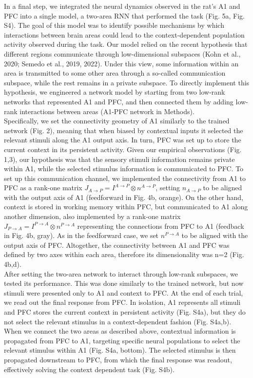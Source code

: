 \documentclass[12pt]{article}
\begin{document}
In a final step, we integrated the neural dynamics observed in the rat’s A1 and PFC into a single model, a two-area RNN that performed the task (Fig. 5a, Fig. S4). The goal of this model was to identify possible mechanisms by which interactions between brain areas could lead to the context-dependent population activity observed during the task. Our model relied on the recent hypothesis that different regions communicate through low-dimensional subspaces (Kohn et al., 2020; Semedo et al., 2019, 2022). Under this view, some information within an area is transmitted to some other area through a so-called communication subspace, while the rest remains in a private subspace. To directly implement this hypothesis, we engineered a network model by starting from two low-rank networks that represented A1 and PFC, and then connected them by adding low-rank interactions between areas (A1-PFC network in Methods). \\

Specifically, we set the connectivity geometry of A1 similarly to the trained network (Fig. 2), meaning that when biased by contextual inputs it selected the relevant stimuli along the A1 output axis. In turn, PFC was set up to store the current context in its persistent activity. Given our empirical observations (Fig. 1,3), our hypothesis was that the sensory stimuli information remains private within A1, while the selected stimulus information is communicated to PFC. To set up this communication channel, we implemented the connectivity from A1 to PFC as a rank-one matrix $J_{A \to P} = I^{A \to P} \otimes n^{A \to P}$, setting $n_{A \to P}$ to be aligned with the output axis of A1 (feedforward in Fig. 4b, orange). On the other hand, context is stored in working memory within PFC, but communicated to A1 along another dimension, also implemented by a rank-one matrix $J_{P \to A} = I^{P \to A} \otimes n^{P \to A}$ representing the connections from PFC to A1 (feedback in Fig. 4b, gray). As in the feedforward case, we set $n^{P \to A}$ to be aligned with the output axis of PFC. Altogether, the connectivity between A1 and PFC was defined by two axes within each area, therefore its dimensionality was n=2 (Fig. 4b,d).  \\

After setting the two-area network to interact through low-rank subspaces, we tested its performance. This was done similarly to the trained network, but now stimuli were presented only to A1 and context to PFC. At the end of each trial, we read out the final response from PFC. In isolation, A1 represents all stimuli and PFC stores the current context in persistent activity (Fig. S4a), but they do not select the relevant stimulus in a context-dependent fashion (Fig. S4a,b). When we connect the two areas as described above, contextual information is propagated from PFC to A1, targeting specific neural populations to select the relevant stimulus within A1 (Fig. S4a, bottom). The selected stimulus is then propagated downstream to PFC, from which the final response was readout, effectively solving the context dependent task (Fig. S4b).  \\
\end{document}
